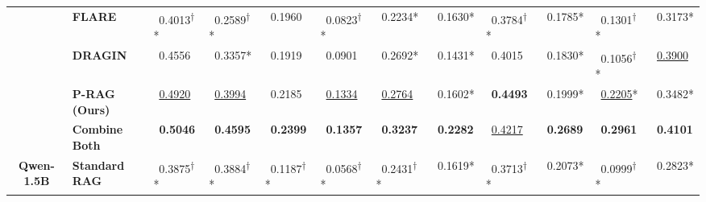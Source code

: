 \documentclass[sigconf,natbib=true,anonymous=false]{acmart}
\begin{document}
\begin{table}[t]
\begin{tabular}{|cl|c|c|c|c|c|c|c|c|c|c|}
& \textbf{FLARE} 
& \multicolumn{1}{l|}{~0.4013\textsuperscript{\tiny $\dagger$}*}& \multicolumn{1}{l|}{~0.2589\textsuperscript{\tiny $\dagger$}*}& \multicolumn{1}{l|}{~0.1960}& \multicolumn{1}{l|}{~0.0823\textsuperscript{\tiny $\dagger$}*}& \multicolumn{1}{l|}{~0.2234*}& \multicolumn{1}{l|}{~0.1630*}& \multicolumn{1}{l|}{~0.3784\textsuperscript{\tiny $\dagger$}*}& \multicolumn{1}{l|}{~0.1785*}& \multicolumn{1}{l|}{~0.1301\textsuperscript{\tiny $\dagger$}*}& \multicolumn{1}{l|}{~0.3173*}\\


& \textbf{DRAGIN}
& \multicolumn{1}{l|}{~0.4556}& \multicolumn{1}{l|}{~0.3357*}& \multicolumn{1}{l|}{~0.1919}& \multicolumn{1}{l|}{~0.0901}& \multicolumn{1}{l|}{~0.2692*}& \multicolumn{1}{l|}{~0.1431*}& \multicolumn{1}{l|}{~0.4015}& \multicolumn{1}{l|}{~0.1830*}& \multicolumn{1}{l|}{~0.1056\textsuperscript{\tiny $\dagger$}*}& \multicolumn{1}{l|}{~\underline{0.3900}}\\


& \textbf{P-RAG  (Ours)}
& \multicolumn{1}{l|}{~\underline{0.4920}}& \multicolumn{1}{l|}{~\underline{0.3994}}& \multicolumn{1}{l|}{~0.2185}& \multicolumn{1}{l|}{~\underline{0.1334}}& \multicolumn{1}{l|}{~\underline{0.2764}}& \multicolumn{1}{l|}{~0.1602*}& \multicolumn{1}{l|}{~\textbf{0.4493}}& \multicolumn{1}{l|}{~0.1999*}& \multicolumn{1}{l|}{~\underline{0.2205}*}& \multicolumn{1}{l|}{~0.3482*}\\

& \textbf{Combine Both}
& \multicolumn{1}{l|}{~\textbf{0.5046}}& \multicolumn{1}{l|}{~\textbf{0.4595}}& \multicolumn{1}{l|}{~\textbf{0.2399}}& \multicolumn{1}{l|}{~\textbf{0.1357}}& \multicolumn{1}{l|}{~\textbf{0.3237}}& \multicolumn{1}{l|}{~\textbf{0.2282}}& \multicolumn{1}{l|}{~\underline{0.4217}}& \multicolumn{1}{l|}{~\textbf{0.2689}}
& \multicolumn{1}{l|}{~\textbf{0.2961}}& \multicolumn{1}{l|}{~\textbf{0.4101}}\\

\toprule

\multirow{6}{*}{\textbf{Qwen-1.5B}}



& \textbf{Standard RAG}
& \multicolumn{1}{l|}{~0.3875\textsuperscript{\tiny $\dagger$}*}& \multicolumn{1}{l|}{~0.3884\textsuperscript{\tiny $\dagger$}*}& \multicolumn{1}{l|}{~0.1187\textsuperscript{\tiny $\dagger$}*}& \multicolumn{1}{l|}{~0.0568\textsuperscript{\tiny $\dagger$}*}& \multicolumn{1}{l|}{~0.2431\textsuperscript{\tiny $\dagger$}*}& \multicolumn{1}{l|}{~0.1619*}& \multicolumn{1}{l|}{~0.3713\textsuperscript{\tiny $\dagger$}*}& \multicolumn{1}{l|}{~0.2073*}& \multicolumn{1}{l|}{~0.0999\textsuperscript{\tiny $\dagger$}*}& \multicolumn{1}{l|}{~0.2823*}\\


\end{tabular}
\end{table}
\end{document}
